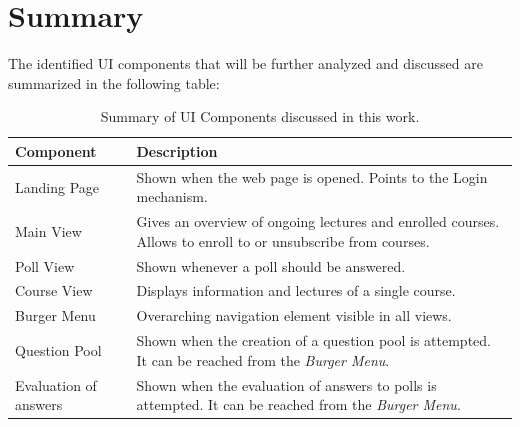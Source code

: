 \section{Summary}
The identified UI components that will be further analyzed and discussed are summarized in the following table:

\begin{table}[H]
	{\renewcommand{\arraystretch}{2}
		\begin{tabular}{ p{4cm} p{11cm}}
			\hline
			Component & Description \\ \hline
			Landing Page & Shown when the web page is opened. Points to the Login mechanism. \\ 
			Main View & Gives an overview of ongoing lectures and enrolled courses. Allows to enroll to or unsubscribe from courses. \\ 
			Poll View & Shown whenever a poll should be answered. \\ 
			Course View & Displays information and lectures of a single course. \\ 
			Burger Menu & Overarching navigation element visible in all views. \\ 
			Question Pool & Shown when the creation of a question pool is attempted. It can be reached from the \emph{Burger Menu}. \\ 
			Evaluation of answers & Shown when the evaluation of answers to polls is attempted. It can be reached from the \emph{Burger Menu}. \\ \hline
		\end{tabular}
	}
	\caption{Summary of UI Components discussed in this work.}
	\label{tab:components}
\end{table}

